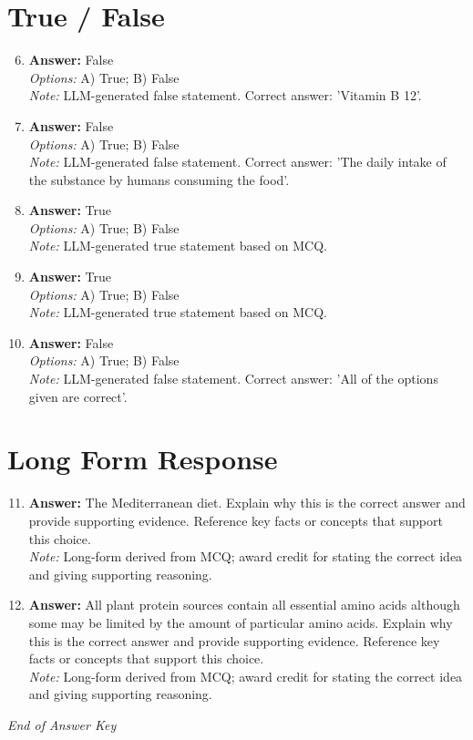 \documentclass[12pt]{article}
\begin{document}
\section*{True / False}
\begin{enumerate}[label=\arabic*.]
\setcounter{enumi}{5}
\item \textbf{Answer:} False
\\ \textit{Options:} A) True; B) False
\\ \textit{Note:} LLM-generated false statement. Correct answer: 'Vitamin B 12'.
\item \textbf{Answer:} False
\\ \textit{Options:} A) True; B) False
\\ \textit{Note:} LLM-generated false statement. Correct answer: 'The daily intake of the substance by humans consuming the food'.
\item \textbf{Answer:} True
\\ \textit{Options:} A) True; B) False
\\ \textit{Note:} LLM-generated true statement based on MCQ.
\item \textbf{Answer:} True
\\ \textit{Options:} A) True; B) False
\\ \textit{Note:} LLM-generated true statement based on MCQ.
\item \textbf{Answer:} False
\\ \textit{Options:} A) True; B) False
\\ \textit{Note:} LLM-generated false statement. Correct answer: 'All of the options given are correct'.
\end{enumerate}

\section*{Long Form Response}
\begin{enumerate}[label=\arabic*.]
\setcounter{enumi}{10}
\item \textbf{Answer:} The Mediterranean diet. Explain why this is the correct answer and provide supporting evidence. Reference key facts or concepts that support this choice.
\\ \textit{Note:} Long-form derived from MCQ; award credit for stating the correct idea and giving supporting reasoning.
\item \textbf{Answer:} All plant protein sources contain all essential amino acids although some may be limited by the amount of particular amino acids. Explain why this is the correct answer and provide supporting evidence. Reference key facts or concepts that support this choice.
\\ \textit{Note:} Long-form derived from MCQ; award credit for stating the correct idea and giving supporting reasoning.
\end{enumerate}

\vfill
\noindent\textit{End of Answer Key}
\end{document}
